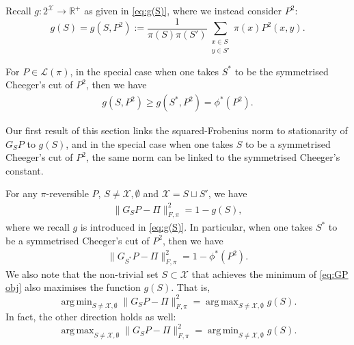 \documentclass[EJP]{ejpecp} %
\DeclareMathOperator*{\argmin}{arg\,min}
\DeclareMathOperator*{\argmax}{arg\,max}
\begin{document}
Recall $g : 2^{\mathcal{X}} \to \mathbb{R}^+$ as given in \eqref{eq:g(S)}, where we instead consider $P^2$:
\begin{equation*}
    g(S) = g(S,P^2) := \frac{1}{\pi(S)\pi(S')} \sum_{\substack{x \in S\\ y \in S'}} \pi(x)P^2(x,y).
\end{equation*}

For $P \in \mathcal{L}(\pi)$, in the special case when one takes $S^*$ to be the symmetrised Cheeger's cut of $P^2$, then we have
\begin{align*}
    g(S,P^2) \geq g(S^*, P^2) = \phi^*(P^2).
\end{align*}

Our first result of this section links the squared-Frobenius norm to stationarity of $G_S P$ to $g(S)$, and in the special case when one takes $S$ to be a symmetrised Cheeger's cut of $P^2$, the same norm can be linked to the symmetrised Cheeger's constant.
\begin{proposition} \label{prop:GP argmin}
    For any $\pi$-reversible $P$, $S \neq \mathcal{X}, \emptyset$ and $\mathcal{X} = S \sqcup S'$, we have
    \begin{align*}
        \|G_S P - \Pi\|_{F, \pi}^2 = 1 - g(S),
    \end{align*}
    where we recall $g$ is introduced in \eqref{eq:g(S)}. In particular, when one takes $S^*$ to be a symmetrised Cheeger's cut of $P^2$, then we have
    \begin{align*}
        \|G_{S^*} P - \Pi\|_{F, \pi}^2 = 1 - \phi^*(P^2).
    \end{align*}
    We also note that the non-trivial set $S \subset \mathcal{X}$ that achieves the minimum of \eqref{eq:GP obj} also maximises the function $g(S)$. That is, 
    $$\argmin_{S \neq \mathcal{X}, \emptyset} \|G_S P - \Pi\|_{F, \pi}^2 = \argmax_{S \neq \mathcal{X}, \emptyset} g(S).$$
    In fact, the other direction holds as well:
    $$\argmax_{S \neq \mathcal{X}, \emptyset} \|G_S P - \Pi\|_{F, \pi}^2 = \argmin_{S \neq \mathcal{X}, \emptyset} g(S).$$
\end{proposition}
\end{document}
